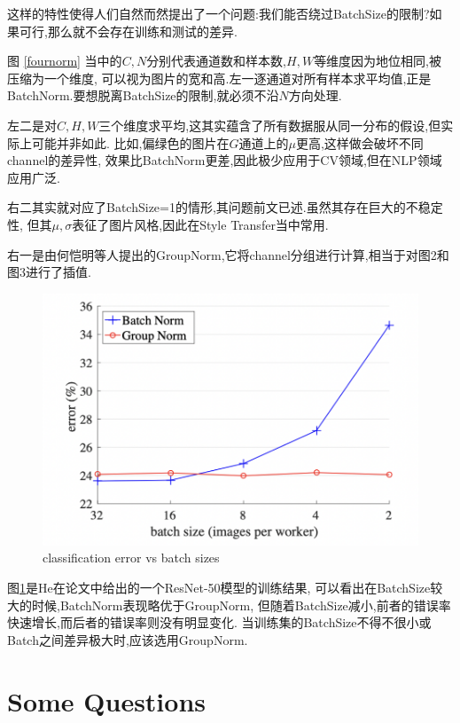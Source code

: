 这样的特性使得人们自然而然提出了一个问题:我们能否绕过BatchSize的限制?如果可行,那么就不会存在训练和测试的差异.

图 \ref{fournorm} 当中的$C,N$分别代表通道数和样本数,$H,W$等维度因为地位相同,被压缩为一个维度,
可以视为图片的宽和高.左一逐通道对所有样本求平均值,正是BatchNorm.要想脱离BatchSize的限制,就必须不沿$N$方向处理.

左二是对$C,H,W$三个维度求平均,这其实蕴含了所有数据服从同一分布的假设,但实际上可能并非如此.
比如,偏绿色的图片在$G$通道上的$\mu$更高,这样做会破坏不同channel的差异性,
效果比BatchNorm更差,因此极少应用于CV领域,但在NLP领域应用广泛.

右二其实就对应了BatchSize=1的情形,其问题前文已述.虽然其存在巨大的不稳定性,
但其$\mu, \sigma$表征了图片风格,因此在Style Transfer当中常用.

右一是由何恺明等人提出的GroupNorm,它将channel分组进行计算,相当于对图2和图3进行了插值.

\begin{figure}[H]
	\centering
	\includegraphics[scale=0.30]{figures/GroupNorm.png}
	\caption{classification error vs batch sizes}
	\label{groupNorm}
\end{figure}

图\ref{groupNorm}是He在论文中给出的一个ResNet-50模型的训练结果,
可以看出在BatchSize较大的时候,BatchNorm表现略优于GroupNorm,
但随着BatchSize减小,前者的错误率快速增长,而后者的错误率则没有明显变化.
当训练集的BatchSize不得不很小或Batch之间差异极大时,应该选用GroupNorm.

\section{Some Questions}

